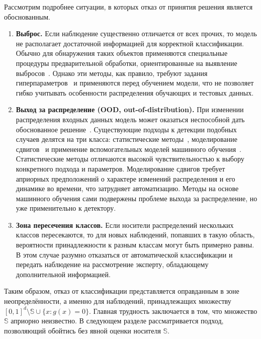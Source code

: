 
Рассмотрим подробнее ситуации, в которых отказ от принятия решения является обоснованным.

\begin{enumerate}
    \item \textbf{Выброс.} Если наблюдение существенно отличается от всех прочих, то модель не располагает достаточной информацией для корректной классификации. Обычно для обнаружения таких объектов применяются специальные процедуры предварительной обработки, ориентированные на выявление выбросов~\cite{boukerche2020outlier}. Однако эти методы, как правило, требуют задания гиперпараметров~\cite{ding2022hyperparameter} и применяются перед обучением модели, что не позволяет гибко учитывать особенности распределения обучающих и тестовых данных.

    \item \textbf{Выход за распределение (OOD, out-of-distribution).} При изменении распределения входных данных модель может оказаться неспособной дать обоснованное решение~\cite{yang2024generalized}. Существующие подходы к детекции подобных случаев делятся на три класса: статистические методы~\cite{caron2024view}, моделирование сдвигов~\cite{vijendran2025boost} и применение вспомогательных моделей машинного обучения~\cite{shmuel2025machine}. Статистические методы отличаются высокой чувствительностью к выбору конкретного подхода и параметров. Моделирование сдвигов требует априорных предположений о характере изменений распределения и его динамике во времени, что затрудняет автоматизацию. Методы на основе машинного обучения сами подвержены проблеме выхода за распределение, но уже применительно к детектору.
    
    \item \textbf{Зона пересечения классов.} Если носители распределений нескольких классов пересекаются, то для новых наблюдений, попавших в такую область, вероятности принадлежности к разным классам могут быть примерно равны. В этом случае разумно отказаться от автоматической классификации и передать наблюдение на рассмотрение эксперту, обладающему дополнительной информацией.
\end{enumerate}

Таким образом, отказ от классификации представляется оправданным в зоне неопределённости, а именно для наблюдений, принадлежащих множеству \([0, 1]^d \setminus \mathbb{S} \cup \{x: g(x) = 0\}\). Главная трудность заключается в том, что множество \(\mathbb{S}\) априорно неизвестно. В следующем разделе рассматривается подход, позволяющий обойтись без явной оценки носителя \(\mathbb{S}\).

